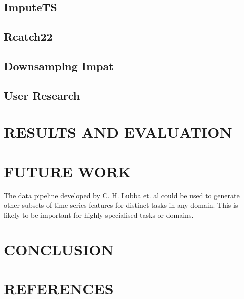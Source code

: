 \documentclass{article}
\begin{document}
\hypertarget{imputets}{%
\subsection{ImputeTS}\label{imputets}}

\hypertarget{rcatch22}{%
\subsection{Rcatch22}\label{rcatch22}}

\hypertarget{downsamplng-impat}{%
\subsection{Downsamplng Impat}\label{downsamplng-impat}}

\hypertarget{user-research}{%
\subsection{User Research}\label{user-research}}

\hypertarget{results-and-evaluation}{%
\section{RESULTS AND EVALUATION}\label{results-and-evaluation}}

\label{sec:headings}

\hypertarget{future-work}{%
\section{FUTURE WORK}\label{future-work}}

\label{sec:headings}

The data pipeline developed by C. H. Lubba et. al could be used to
generate other subsets of time series features for distinct tasks in any
domain. This is likely to be important for highly specialised tasks or
domains.

\hypertarget{conclusion}{%
\section{CONCLUSION}\label{conclusion}}

\label{sec:headings}

\hypertarget{references}{%
\section{REFERENCES}\label{references}}
\end{document}
